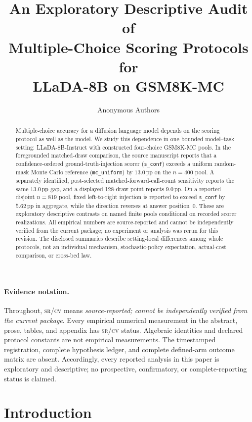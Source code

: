 \documentclass{article}
\title{An Exploratory Descriptive Audit of\\
Multiple-Choice Scoring Protocols for\\
LLaDA-8B on GSM8K-MC}
\author{Anonymous Authors}
\newcommand{\sconf}{\texttt{s\_conf}}
\newcommand{\mcu}{\texttt{mc\_uniform}}
\newcommand{\pp}{\,\mathrm{pp}}
\newcommand{\srcv}{\textsc{sr/cv}}
\begin{document}
\maketitle
\thispagestyle{fancy}

\begin{abstract}
Multiple-choice accuracy for a diffusion language model depends on the scoring
protocol as well as the model.  We study this dependence in one bounded
model--task setting:
LLaDA-8B-Instruct with constructed four-choice GSM8K-MC pools.  In the
foregrounded matched-draw comparison, the source manuscript reports that a
confidence-ordered ground-truth-injection scorer (\sconf{}) exceeds a uniform
random-mask Monte Carlo reference (\mcu{}) by $13.0\pp$ on the $n{=}400$
pool.  A separately identified, post-selected matched-forward-call-count
sensitivity reports the same $13.0\pp$ gap, and a displayed 128-draw point
reports $9.0\pp$.  On a reported disjoint $n{=}819$ pool, fixed left-to-right
injection is reported to exceed \sconf{} by $5.62\pp$ in aggregate, while the
direction reverses at answer position~0.  These are exploratory descriptive
contrasts on named finite pools conditional on recorded scorer realizations.
All empirical numbers are source-reported and cannot be independently verified
from the current package; no experiment or analysis was rerun for this
revision.  The disclosed summaries describe setting-local differences among
whole protocols, not an individual mechanism, stochastic-policy
expectation, actual-cost comparison, or cross-bed law.
\end{abstract}

\paragraph{Evidence notation.}
Throughout, \srcv{} means \emph{source-reported; cannot be independently
verified from the current package}.  Every empirical numerical measurement in
the abstract, prose, tables, and appendix has \srcv{} status.  Algebraic
identities and declared protocol constants are not empirical measurements.
The timestamped registration, complete hypothesis ledger, and complete
defined-arm outcome matrix are absent.  Accordingly, every reported analysis
in this paper is exploratory and descriptive; no prospective, confirmatory, or
complete-reporting status is claimed.

\section{Introduction}
\label{sec:intro}
\end{document}

